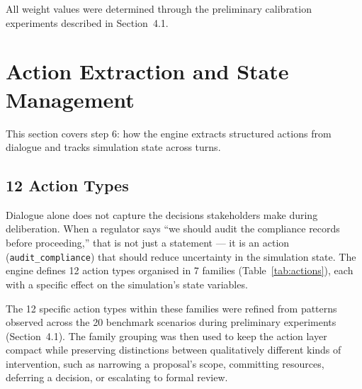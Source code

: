 \documentclass[12pt, a4paper]{report}
\begin{document}
All weight values were determined through the preliminary calibration experiments described in Section~4.1.


\section{Action Extraction and State Management}

This section covers step 6: how the engine extracts structured actions from dialogue and tracks simulation state across turns.

\subsection{12 Action Types}

Dialogue alone does not capture the decisions stakeholders make during deliberation. When a regulator says ``we should audit the compliance records before proceeding,'' that is not just a statement --- it is an action (\texttt{audit\_compliance}) that should reduce uncertainty in the simulation state. The engine defines 12 action types organised in 7 families (Table~\ref{tab:actions}), each with a specific effect on the simulation's state variables.

The 12 specific action types within these families were refined from patterns observed across the 20 benchmark scenarios during preliminary experiments (Section~4.1). The family grouping was then used to keep the action layer compact while preserving distinctions between qualitatively different kinds of intervention, such as narrowing a proposal's scope, committing resources, deferring a decision, or escalating to formal review.
\end{document}
